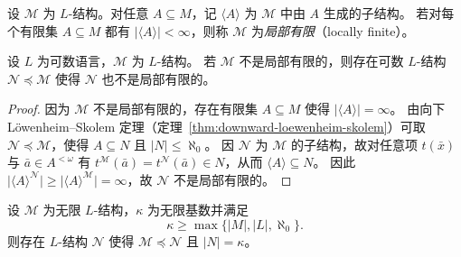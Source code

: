 \documentclass[lang=cn,a4paper,newtx,section]{elegantbook}
\begin{document}
 \begin{definition}[局部有限]
 设 $\mathcal M$ 为 $L$-结构。对任意 $A\subseteq M$，记 $\langle A\rangle$ 为 $\mathcal M$ 中由 $A$ 生成的子结构。
 若对每个有限集 $A\subseteq M$ 都有 $\lvert\langle A\rangle\rvert<\infty$，则称 $\mathcal M$ 为\emph{局部有限}（locally finite）。
 \end{definition}

 \begin{proposition}
 设 $L$ 为可数语言，$\mathcal M$ 为 $L$-结构。
 若 $\mathcal M$ 不是局部有限的，则存在可数 $L$-结构 $\mathcal N\preccurlyeq\mathcal M$ 使得 $\mathcal N$ 也不是局部有限的。
 \end{proposition}

 \begin{proof}
 因为 $\mathcal M$ 不是局部有限的，存在有限集 $A\subseteq M$ 使得 $\lvert\langle A\rangle\rvert=\infty$。
 由向下 Löwenheim--Skolem 定理（定理~\ref{thm:downward-loewenheim-skolem}）可取 $\mathcal N\preccurlyeq\mathcal M$，使得 $A\subseteq N$ 且 $\lvert N\rvert\le\aleph_0$。
 因 $\mathcal N$ 为 $\mathcal M$ 的子结构，故对任意项 $t(\bar x)$ 与 $\bar a\in A^{<\omega}$ 有 $t^{\mathcal M}(\bar a)=t^{\mathcal N}(\bar a)\in N$，从而 $\langle A\rangle\subseteq N$。
 因此 $\lvert\langle A\rangle^{\mathcal N}\rvert\ge\lvert\langle A\rangle^{\mathcal M}\rvert=\infty$，故 $\mathcal N$ 不是局部有限的。
 \end{proof}

 \begin{theorem}
 \label{upward-loewenheim-skolem}
 设 $\mathcal M$ 为无限 $L$-结构，$\kappa$ 为无限基数并满足
 \[
   \kappa\ge \max\{\lvert M\rvert,\lvert L\rvert,\aleph_0\}.
 \]
 则存在 $L$-结构 $\mathcal N$ 使得 $\mathcal M\preccurlyeq\mathcal N$ 且 $\lvert N\rvert=\kappa$。
 \end{theorem}
\end{document}

